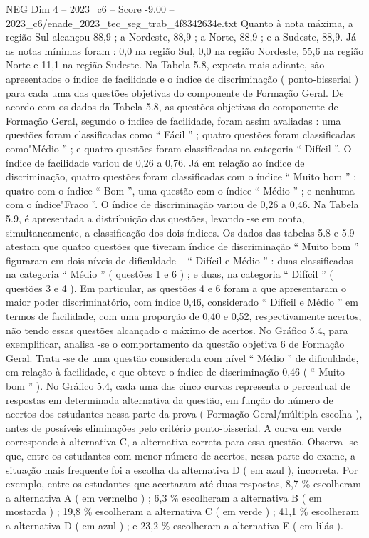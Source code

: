 \begin{textsample}{NEG Dim 4 – 2023\_c6 – Score -9.00 – 2023\_c6/enade\_2023\_tec\_seg\_trab\_4f8342634e.txt}
Quanto à nota máxima, a região Sul alcançou 88,9 ; a Nordeste, 88,9 ; a Norte, 88,9 ; e a Sudeste, 88,9.
Já as notas mínimas foram : 0,0 na região Sul, 0,0 na região Nordeste, 55,6 na região Norte e 11,1 na região Sudeste.
Na Tabela 5.8, exposta mais adiante, são apresentados o índice de facilidade e o índice de discriminação ( ponto-bisserial ) para cada uma das questões objetivas do componente de Formação Geral.
De acordo com os dados da Tabela 5.8, as questões objetivas do componente de Formação Geral, segundo o índice de facilidade, foram assim avaliadas : uma questões foram classificadas como “ Fácil ” ; quatro questões foram classificadas como"Médio ” ; e quatro questões foram classificadas na categoria “ Difícil ”.
O índice de facilidade variou de 0,26 a 0,76.
Já em relação ao índice de discriminação, quatro questões foram classificadas com o índice “ Muito bom ” ; quatro com o índice “ Bom ”, uma questão com o índice “ Médio ” ; e nenhuma com o índice"Fraco ”.
O índice de discriminação variou de 0,26 a 0,46.
Na Tabela 5.9, é apresentada a distribuição das questões, levando -se em conta, simultaneamente, a classificação dos dois índices.
Os dados das tabelas 5.8 e 5.9 atestam que quatro questões que tiveram índice de discriminação “ Muito bom ” figuraram em dois níveis de dificuldade – “ Difícil e Médio ” : duas classificadas na categoria “ Médio ” ( questões 1 e 6 ) ; e duas, na categoria “ Difícil ” ( questões 3 e 4 ).
Em particular, as questões 4 e 6 foram a que apresentaram o maior poder discriminatório, com índice 0,46, considerado “ Difícil e Médio ” em termos de facilidade, com uma proporção de 0,40 e 0,52, respectivamente acertos, não tendo essas questões alcançado o máximo de acertos.
No Gráfico 5.4, para exemplificar, analisa -se o comportamento da questão objetiva 6 de Formação Geral.
Trata -se de uma questão considerada com nível “ Médio ” de dificuldade, em relação à facilidade, e que obteve o índice de discriminação 0,46 ( “ Muito bom ” ).
No Gráfico 5.4, cada uma das cinco curvas representa o percentual de respostas em determinada alternativa da questão, em função do número de acertos dos estudantes nessa parte da prova ( Formação Geral/múltipla escolha ), antes de possíveis eliminações pelo critério ponto-bisserial.
A curva em verde corresponde à alternativa C, a alternativa correta para essa questão.
Observa -se que, entre os estudantes com menor número de acertos, nessa parte do exame, a situação mais frequente foi a escolha da alternativa D ( em azul ), incorreta.
Por exemplo, entre os estudantes que acertaram até duas respostas, 8,7 \% escolheram a alternativa A ( em vermelho ) ; 6,3 \% escolheram a alternativa B ( em mostarda ) ; 19,8 \% escolheram a alternativa C ( em verde ) ; 41,1 \% escolheram a alternativa D ( em azul ) ; e 23,2 \% escolheram a alternativa E ( em lilás ).

\end{textsample}
